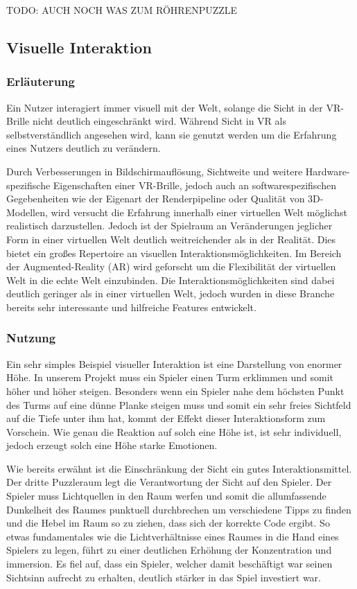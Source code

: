 TODO: AUCH NOCH WAS ZUM RÖHRENPUZZLE


\subsection{Visuelle Interaktion}

\subsubsection{Erläuterung}
Ein Nutzer interagiert immer visuell mit der Welt, solange die Sicht in der VR-Brille nicht deutlich eingeschränkt wird. Während Sicht in VR als selbstverständlich angesehen wird, kann sie genutzt werden um die Erfahrung eines Nutzers deutlich zu verändern. 

Durch Verbesserungen in Bildschirmauflösung, Sichtweite und weitere Hardware-spezifische Eigenschaften einer VR-Brille, jedoch auch an softwarespezifischen Gegebenheiten wie der Eigenart der Renderpipeline oder Qualität von 3D-Modellen, wird versucht die Erfahrung innerhalb einer virtuellen Welt möglichst realistisch darzustellen. Jedoch ist der Spielraum an Veränderungen jeglicher Form in einer virtuellen Welt deutlich weitreichender als in der Realität. Dies bietet ein großes Repertoire an visuellen Interaktionsmöglichkeiten. Im Bereich der Augmented-Reality (AR) wird geforscht um die Flexibilität der virtuellen Welt in die echte Welt einzubinden. Die Interaktionsmöglichkeiten sind dabei deutlich geringer als in einer virtuellen Welt, jedoch wurden in diese Branche bereits sehr interessante und hilfreiche Features entwickelt.

\subsubsection{Nutzung}
Ein sehr simples Beispiel visueller Interaktion ist eine Darstellung von enormer Höhe. In unserem Projekt muss ein Spieler einen Turm erklimmen und somit höher und höher steigen. Besonders wenn ein Spieler nahe dem höchsten Punkt des Turms auf eine dünne Planke steigen muss und somit ein sehr freies Sichtfeld auf die Tiefe unter ihm hat, kommt der Effekt dieser Interaktionsform zum Vorschein. Wie genau die Reaktion auf solch eine Höhe ist, ist sehr individuell, jedoch erzeugt solch eine Höhe starke Emotionen.

Wie bereits erwähnt ist die Einschränkung der Sicht ein gutes Interaktionsmittel. Der dritte Puzzleraum legt die Verantwortung der Sicht auf den Spieler. Der Spieler muss Lichtquellen in den Raum werfen und somit die allumfassende Dunkelheit des Raumes punktuell durchbrechen um verschiedene Tipps zu finden und die Hebel im Raum so zu ziehen, dass sich der korrekte Code ergibt. So etwas fundamentales wie die Lichtverhältnisse eines Raumes in die Hand eines Spielers zu legen, führt zu einer deutlichen Erhöhung der Konzentration und immersion. Es fiel auf, dass ein Spieler, welcher damit beschäftigt war seinen Sichtsinn aufrecht zu erhalten, deutlich stärker in das Spiel investiert war.

